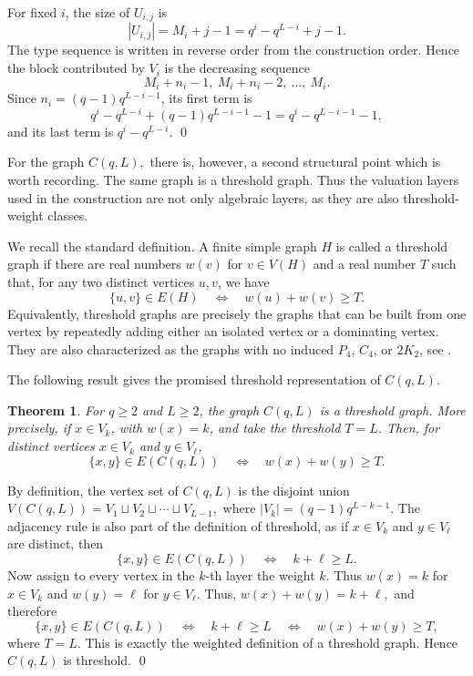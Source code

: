 \documentclass[12pt]{article}
\newtheorem{theorem}{Theorem}[section]
\theoremstyle{definition}
\renewenvironment{proof}{{\bf \noindent Proof.}}{\qed}
\begin{document}
\begin{proof}
	For fixed $i$, the size of $U_{i,j}$ is
	$$
	|U_{i,j}|=M_i+j-1=q^i-q^{L-i}+j-1.
	$$
	The type sequence is written in reverse order from the construction order.  Hence the block contributed by $V_i$ is the decreasing sequence
	$$
	M_i+n_i-1,\ M_i+n_i-2,\ \ldots,\ M_i.
	$$
	Since $n_i=(q-1)q^{L-i-1}$, its first term is
	$$
	q^i-q^{L-i}+(q-1)q^{L-i-1}-1=q^i-q^{L-i-1}-1,
	$$
	and its last term is $q^i-q^{L-i}$. 
\end{proof}

\medskip



For the graph $C(q,L),$ there is, however, a second structural point which is worth recording.  The same graph is a threshold graph.  Thus the valuation layers used in the construction are not only algebraic layers, as they are also threshold-weight classes.

\medskip

We recall the standard definition.  A finite simple graph $H$ is called a threshold graph if there are real numbers $w(v)$ for $v\in V(H)$ and a real number $T$ such that, for any two distinct vertices $u,v$, we have
$$
\{u,v\}\in E(H)\quad\Longleftrightarrow\quad w(u)+w(v)\ge T.
$$
Equivalently, threshold graphs are precisely the graphs that can be built from one vertex by repeatedly adding either an isolated vertex or a dominating vertex.  They are also characterized as the graphs with no induced $P_4$, $C_4$, or $2K_2$, see \cite{ChvatalHammer,maPeledThreshold}.

\medskip

The following result gives the promised threshold representation of $C(q,L)$.

\medskip

\begin{theorem}\label{thm:CqL-threshold}
	For $q\ge2$ and $L\ge2$, the graph $C(q,L)$ is a threshold graph.  More precisely, if $x\in V_k$, with $w(x)=k$, and take the threshold $T=L$.  Then, for distinct vertices $x\in V_k$ and $y\in V_\ell$,
	$$
	\{x,y\}\in E(C(q,L))\quad\Longleftrightarrow\quad w(x)+w(y)\ge T.
	$$
\end{theorem}

\begin{proof}
	By definition, the vertex set of $C(q,L)$ is the disjoint union
	$ V(C(q,L))=V_1\sqcup V_2\sqcup\cdots\sqcup V_{L-1}, $
	where $|V_k|=(q-1)q^{L-k-1}$.  The adjacency rule is also part of the definition of threshold, as if $x\in V_k$ and $y\in V_\ell$ are distinct, then
	$$
	\{x,y\}\in E(C(q,L))\quad\Longleftrightarrow\quad k+\ell\ge L.
	$$
	Now assign to every vertex in the $k$-th layer the weight $k$.  Thus $w(x)=k$ for $x\in V_k$ and $w(y)=\ell$ for $y\in V_\ell$.  Thus,
	$ w(x)+w(y)=k+\ell,$ and therefore
	$$
	\{x,y\}\in E(C(q,L))
	\quad\Longleftrightarrow\quad
	k+\ell\ge L
	\quad\Longleftrightarrow\quad
	w(x)+w(y)\ge T,
	$$
	where $T=L$.  This is exactly the weighted definition of a threshold graph.  Hence $C(q,L)$ is threshold.
\end{proof}
\end{document}
